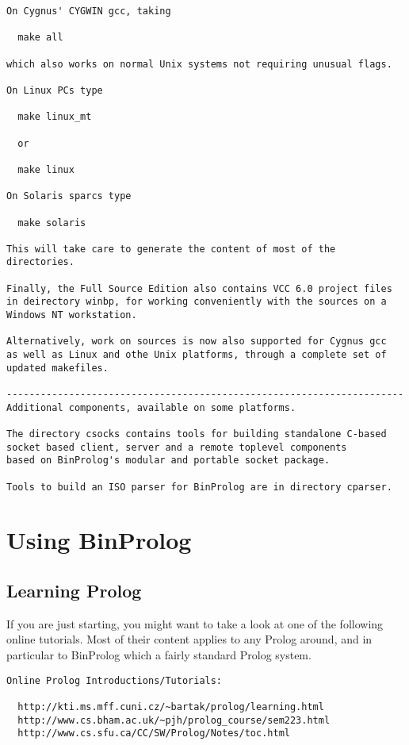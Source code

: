 \documentclass{article}
\begin{document}
{\begin{verbatim}
On Cygnus' CYGWIN gcc, taking

  make all

which also works on normal Unix systems not requiring unusual flags.

On Linux PCs type

  make linux_mt
  
  or
  
  make linux

On Solaris sparcs type

  make solaris

This will take care to generate the content of most of the directories.

Finally, the Full Source Edition also contains VCC 6.0 project files
in deirectory winbp, for working conveniently with the sources on a 
Windows NT workstation.

Alternatively, work on sources is now also supported for Cygnus gcc
as well as Linux and othe Unix platforms, through a complete set of
updated makefiles.

----------------------------------------------------------------------
Additional components, available on some platforms.

The directory csocks contains tools for building standalone C-based
socket based client, server and a remote toplevel components 
based on BinProlog's modular and portable socket package.

Tools to build an ISO parser for BinProlog are in directory cparser.
\end{verbatim}}

\section{Using BinProlog}

\subsection{Learning Prolog}

If you are just starting, you might want to take a look at one of
the following online tutorials. Most of their content applies to
any Prolog around, and in particular to BinProlog which a fairly
standard Prolog system.

\begin{verbatim}
Online Prolog Introductions/Tutorials:

  http://kti.ms.mff.cuni.cz/~bartak/prolog/learning.html 
  http://www.cs.bham.ac.uk/~pjh/prolog_course/sem223.html 
  http://www.cs.sfu.ca/CC/SW/Prolog/Notes/toc.html 
\end{verbatim}
\end{document}
